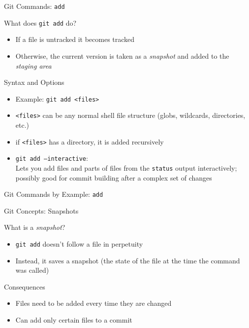 \documentclass[table,dvipsnames]{beamer}
\begin{document}
\begin{frame}{Git Commands: \texttt{add}}
	\begin{block}{What does \texttt{git add} do?}
		\begin{itemize}
			\item If a file is untracked it becomes tracked
			\item Otherwise, the current version is taken as a \emph{snapshot} 
				and added to the \emph{staging area}
		\end{itemize}
	\end{block}
	\begin{block}{Syntax and Options}
		\begin{itemize}
			\item Example: \texttt{git add <files>}
			\item \texttt{<files>} can be any normal shell file structure (globs, wildcards,
				directories, etc.)
			\item if \texttt{<files>} has a directory, it is added recursively
			\item \texttt{git add --interactive}: \\
				Lets you add files and parts of files from the \texttt{status} output interactively;
				possibly good for commit building after a complex set of changes
		\end{itemize}
	\end{block}
\end{frame}


\begin{frame}{Git Commands by Example: \texttt{add}}
\end{frame}

\begin{frame}{Git Concepts: Snapshots}
	\begin{block}{What is a \emph{snapshot}?}
		\begin{itemize}
			\item \texttt{git add} doesn't follow a file in perpetuity
			\item Instead, it saves a snapshot (the state of the file at the 
				time the command was called)
		\end{itemize}
	\end{block}
	\begin{block}{Consequences}
		\begin{itemize}
			\item Files need to be added every time they are changed
			\item Can add only certain files to a commit
		\end{itemize}
	\end{block}
\end{frame}
\end{document}
